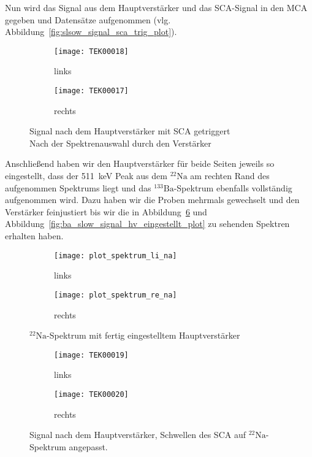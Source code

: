 \documentclass[11pt, ngerman, fleqn, DIV=15, headinclude, BCOR=2cm]{scrreprt}
\begin{document}
Nun wird das Signal aus dem Hauptverstärker und das SCA-Signal in den MCA
gegeben und Datensätze aufgenommen (vlg.
Abbildung~\ref{fig:slsow_signal_sca_trig_plot}).
\begin{figure}[htbp]
	\centering
	\begin{subfigure}{0.49 \textwidth}
		\texttt{[image: TEK00018]}
		\caption{%
			links
		}
		\label{fig:slow_signal_hv_eingestellt-li}
	\end{subfigure}
	\begin{subfigure}{0.49 \textwidth}
		\texttt{[image: TEK00017]}
		\caption{%
			rechts
		}
		\label{fig:slow_signal_hv_eingestellt-re}
	\end{subfigure}
	\caption{%
		Signal nach dem Hauptverstärker mit SCA getriggert\\
		Nach der Spektrenauswahl durch den Verstärker
	}
	\label{fig:slow_signal_hv_eingestellt}
\end{figure}
Anschließend haben wir den Hauptverstärker für beide Seiten jeweils so
eingestellt, dass der \SI{511}{\kilo\electronvolt} Peak aus dem
$^{22}\text{Na}$ am rechten Rand des aufgenommen Spektrums liegt und das
$^{133}\text{Ba}$-Spektrum ebenfalls vollständig aufgenommen wird. Dazu haben
wir die Proben mehrmals gewechselt und den Verstärker feinjustiert bis wir die
in Abbildung~\ref{fig:slow_signal_hv_eingestellt_plot} und
Abbildung~\ref{fig:ba_slow_signal_hv_eingestellt_plot} zu sehenden Spektren
erhalten haben.

\begin{figure}[htbp]
	\centering
	\begin{subfigure}{0.49 \textwidth}
		\texttt{[image: plot\_spektrum\_li\_na]}
		\caption{%
			links
		}
		\label{fig:slow_hv_eingestellt-li_plot}
	\end{subfigure}
	\begin{subfigure}{0.49 \textwidth}
		\texttt{[image: plot\_spektrum\_re\_na]}
		\caption{%
			rechts
		}
		\label{fig:slow_hv_eingestellt-re_plot}
	\end{subfigure}
	\caption{%
		$^{22}\text{Na}$-Spektrum mit fertig eingestelltem
		Hauptverstärker
	}
	\label{fig:slow_signal_hv_eingestellt_plot}
\end{figure}

\begin{figure}[htbp]
	\centering
	\begin{subfigure}{0.49 \textwidth}
		\texttt{[image: TEK00019]}
		\caption{%
			links
		}
		\label{fig:slow_signal_sca_eingestellt-li}
	\end{subfigure}
	\begin{subfigure}{0.49 \textwidth}
		\texttt{[image: TEK00020]}
		\caption{%
			rechts
		}
		\label{fig:slow_signal_sca_eingestellt-re}
	\end{subfigure}
	\caption{%
		Signal nach dem Hauptverstärker, Schwellen des SCA auf
		$^{22}\text{Na}$-Spektrum angepasst.
	}
	\label{fig:slow_signal_sca_eingestellt}
\end{figure}
\end{document}
